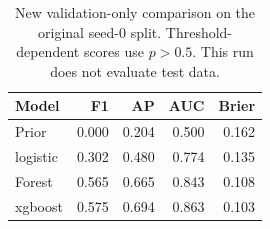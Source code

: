 \begin{table}[t]
\centering\small
\begin{tabular}{lrrrr}
\hline
Model & F1 & AP & AUC & Brier \\
\hline
Prior & 0.000 & 0.204 & 0.500 & 0.162 \\
logistic & 0.302 & 0.480 & 0.774 & 0.135 \\
Forest & 0.565 & 0.665 & 0.843 & 0.108 \\
xgboost & 0.575 & 0.694 & 0.863 & 0.103 \\
\hline
\end{tabular}
\caption{New validation-only comparison on the original seed-0 split. Threshold-dependent scores use $p>0.5$. This run does not evaluate test data.}
\label{tab:extension}
\end{table}

